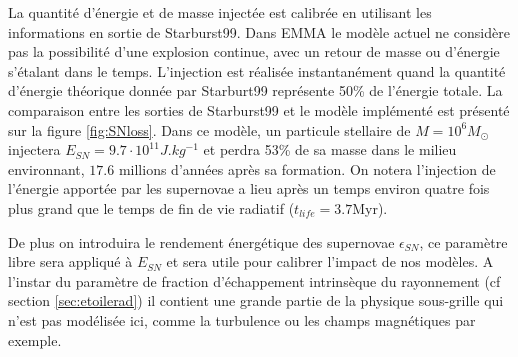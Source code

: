 La quantité d'énergie et de masse injectée est calibrée en utilisant les informations en sortie de Starburst99.
Dans EMMA le modèle actuel ne considère pas la possibilité d'une explosion continue, avec un retour de masse ou d'énergie s'étalant dans le temps.
L'injection est réalisée instantanément quand la quantité d’énergie théorique donnée par Starburt99 représente 50\% de l’énergie totale.
La comparaison entre les sorties de Starburst99 et le modèle implémenté est présenté sur la figure \ref{fig:SNloss}.
Dans ce modèle, un particule stellaire de $M=10^6 M_\odot$ injectera $E_{SN} = 9.7\cdot 10^{11} J.kg^{-1}$ et perdra 53\% de sa masse dans le milieu environnant, $17.6$ millions d'années après sa formation.
On notera l'injection de l'énergie apportée par les supernovae a lieu après un temps environ quatre fois plus grand que le temps de fin de vie radiatif ($t_{life} = 3.7$Myr).

De plus on introduira le rendement énergétique des supernovae $\epsilon_{SN}$, ce paramètre libre sera appliqué à $E_{SN}$ et sera utile pour calibrer l'impact de nos modèles.
A l'instar du paramètre de fraction d'échappement intrinsèque du rayonnement (cf section \ref{sec:etoilerad}) il contient une grande partie de la physique sous-grille qui n'est pas modélisée ici, comme la turbulence ou les champs magnétiques par exemple.

